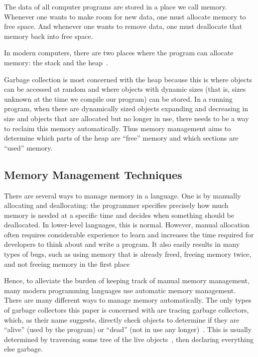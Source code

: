 \documentclass[index]{subfiles}
\begin{document}
The data of all computer programs are stored in a place we call memory. Whenever one wants to make room for new data, one must allocate memory to free space. And whenever one wants to remove data, one must deallocate that memory back into free space.

In modern computers, there are two places where the program can allocate memory: the stack and the heap~\parencite{the_rust_programming_language}.

Garbage collection is most concerned with the heap because this is where objects can be accessed at random and where objects with dynamic sizes (that is, sizes unknown at the time we compile our program) can be stored. In a running program, when there are dynamically sized objects expanding and decreasing in size and objects that are allocated but no longer in use, there needs to be a way to reclaim this memory automatically. Thus memory management aims to determine which parts of the heap are ``free'' memory and which sections are ``used'' memory.

\subsection{Memory Management Techniques}

There are several ways to manage memory in a language. One is by manually allocating and deallocating: the programmer specifies precisely how much memory is needed at a specific time and decides when something should be deallocated. In lower-level languages, this is normal. However, manual allocation often requires considerable experience to learn and increases the time required for developers to think about and write a program. It also easily results in many types of bugs, such as using memory that is already freed, freeing memory twice, and not freeing memory in the first place~\parencites{garbage_collection_overview_uw}[Chapter~1]{gc_handbook}

Hence, to alleviate the burden of keeping track of manual memory management, many modern programming languages use automatic memory management. There are many different ways to manage memory automatically. The only types of garbage collectors this paper is concerned with are tracing garbage collectors, which, as their name suggests, directly check objects to determine if they are ``alive'' (used by the program) or ``dead'' (not in use any longer)~\parencite{a_unified_theory_of_garbage_collection}. This is usually determined by traversing some tree of the live objects~\parencite[Chapter~1]{gc_handbook}, then declaring everything else garbage.
\end{document}
